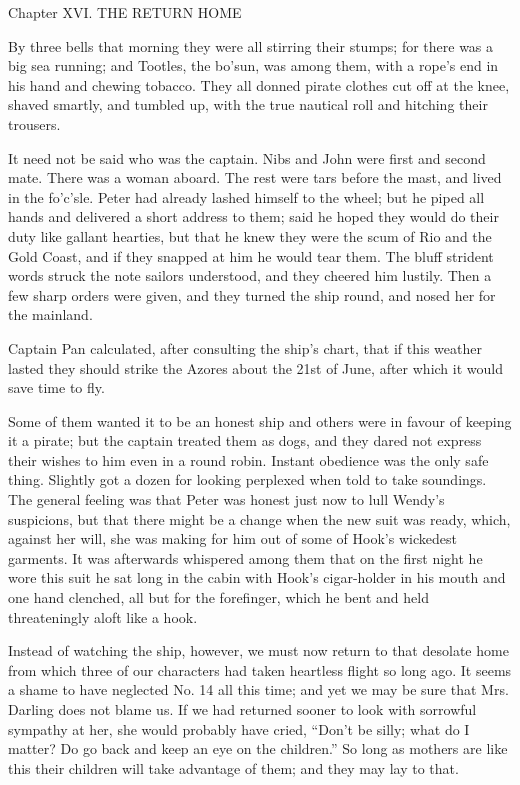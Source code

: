 Chapter XVI.
THE RETURN HOME


By three bells that morning they were all stirring their stumps; for
there was a big sea running; and Tootles, the bo'sun, was among them,
with a rope's end in his hand and chewing tobacco. They all donned
pirate clothes cut off at the knee, shaved smartly, and tumbled up,
with the true nautical roll and hitching their trousers.

It need not be said who was the captain. Nibs and John were first and
second mate. There was a woman aboard. The rest were tars before the
mast, and lived in the fo'c'sle. Peter had already lashed himself to
the wheel; but he piped all hands and delivered a short address to
them; said he hoped they would do their duty like gallant hearties, but
that he knew they were the scum of Rio and the Gold Coast, and if they
snapped at him he would tear them. The bluff strident words struck the
note sailors understood, and they cheered him lustily. Then a few sharp
orders were given, and they turned the ship round, and nosed her for
the mainland.

Captain Pan calculated, after consulting the ship's chart, that if this
weather lasted they should strike the Azores about the 21st of June,
after which it would save time to fly.

Some of them wanted it to be an honest ship and others were in favour
of keeping it a pirate; but the captain treated them as dogs, and they
dared not express their wishes to him even in a round robin. Instant
obedience was the only safe thing. Slightly got a dozen for looking
perplexed when told to take soundings. The general feeling was that
Peter was honest just now to lull Wendy's suspicions, but that there
might be a change when the new suit was ready, which, against her will,
she was making for him out of some of Hook's wickedest garments. It was
afterwards whispered among them that on the first night he wore this
suit he sat long in the cabin with Hook's cigar-holder in his mouth and
one hand clenched, all but for the forefinger, which he bent and held
threateningly aloft like a hook.

Instead of watching the ship, however, we must now return to that
desolate home from which three of our characters had taken heartless
flight so long ago. It seems a shame to have neglected No. 14 all this
time; and yet we may be sure that Mrs. Darling does not blame us. If we
had returned sooner to look with sorrowful sympathy at her, she would
probably have cried, ``Don't be silly; what do I matter? Do go back and
keep an eye on the children.'' So long as mothers are like this their
children will take advantage of them; and they may lay to that.

